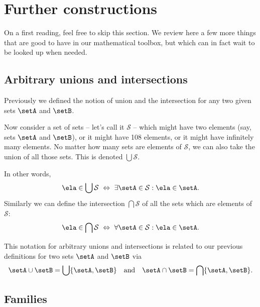 
\section{Further constructions}
\label{sec:more-constructions}

On a first reading, feel free to skip this section. We review here a few more things that are good to have in our mathematical toolbox, but which can in fact wait to be looked up when needed. 


\subsection{Arbitrary unions and intersections}

Previously we defined the notion of union and the intersection for any two given sets $\setA$ and $\setB$. 

Now consider a set of sets -- let's call it $\mathcal{S}$ -- which might have two elements (say, sets $\setA$ and $\setB$), or it might have 108 elements, or it might have infinitely many elements. No matter how many sets are elements of $\mathcal{S}$, we can also take the union of all those sets. This is denoted $\bigcup \mathcal{S}$. 

In other words, 
%
\begin{equation*}
    \ela \in \bigcup \mathcal{S}  \ \Leftrightarrow \ \exists \setA \in \mathcal{S} : \ela \in \setA.
\end{equation*}
%
Similarly we can define the intersection $\bigcap \mathcal{S}$ of all the sets which are elements of $\mathcal{S}$: 
%
\begin{equation*}
     \ela \in \bigcap \mathcal{S} \ \Leftrightarrow \  \forall \setA \in \mathcal{S} : \ela \in \setA.
\end{equation*}

This notation for arbitrary unions and intersections is related to our previous definitions for two sets $\setA$ and $\setB$ via
\begin{equation}
\setA \cup \setB = \bigcup \{ \setA, \setB \} \quad \text{and} \quad \setA \cap \setB = \bigcap \{ \setA, \setB \}.
\end{equation}



\subsection{Families}

